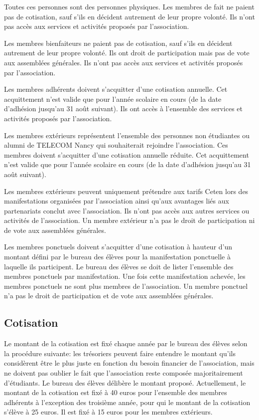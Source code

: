 \documentclass{article} %
\begin{document}
			Toutes ces personnes sont des personnes physiques. Les membres de
			fait ne paient pas de cotisation, sauf s’ils en décident autrement
			de leur propre volonté. Ils n’ont pas accès aux services et
			activités proposés par l’association.

			Les membres bienfaiteurs ne paient pas de cotisation, sauf s’ils en
			décident autrement de leur propre volonté. Ils ont droit de
			participation mais pas de vote aux assemblées générales. Ils n’ont
			pas accès aux services et activités proposés par l’association.

			Les membres adhérents doivent s’acquitter d’une cotisation annuelle.
			Cet acquittement n’est valide que pour l’année scolaire en cours
			(de la date d’adhésion jusqu’au 31 août suivant). Ils ont accès à
			l’ensemble des services et activités proposés par l’association.

			Les membres extérieurs représentent l’ensemble des personnes non
			étudiantes ou alumni de TELECOM Nancy qui souhaiterait rejoindre
			l’association. Ces membres doivent s’acquitter d’une cotisation
			annuelle réduite. Cet acquittement n’est valide que pour l’année
			scolaire en cours (de la date d’adhésion jusqu’au 31 août suivant).

			Les membres extérieurs peuvent uniquement prétendre aux tarifs Ceten
			lors des manifestations organisées par l’association ainsi qu’aux
			avantages liés aux partenariats conclut avec l’association. Ils
			n’ont pas accès aux autres services ou activités de l’association.
			Un membre extérieur n’a pas le droit de participation ni de vote aux
			assemblées générales.

			Les membres ponctuels doivent s’acquitter d’une cotisation à hauteur
			d’un montant défini par le bureau des élèves pour la manifestation
			ponctuelle à laquelle ils participent. Le bureau des élèves se doit
			de lister l’ensemble des membres ponctuels par manifestation. Une
			fois cette manifestation achevée, les membres ponctuels ne sont plus
			membres de l’association. Un membre ponctuel n’a pas le droit de
			participation et de vote aux assemblées générales.

		\subsection{Cotisation}
\label{sub:cotisation}

			Le montant de la cotisation est fixé chaque année par le bureau des
			élèves selon la procédure suivante: les trésoriers peuvent faire
			entendre le montant qu’ils considèrent être le plus juste en
			fonction du besoin financier de l’association, mais ne doivent pas
			oublier le fait que l’association reste composée majoritairement
			d'étudiants. Le bureau des élèves délibère le montant proposé.
			Actuellement, le montant de la cotisation est fixé à 40 euros pour
			l’ensemble des membres adhérents à l’exception des troisième année,
			pour qui le montant de la cotisation s’élève à 25 euros. Il est fixé
			à 15 euros pour les membres extérieurs.
\end{document}
